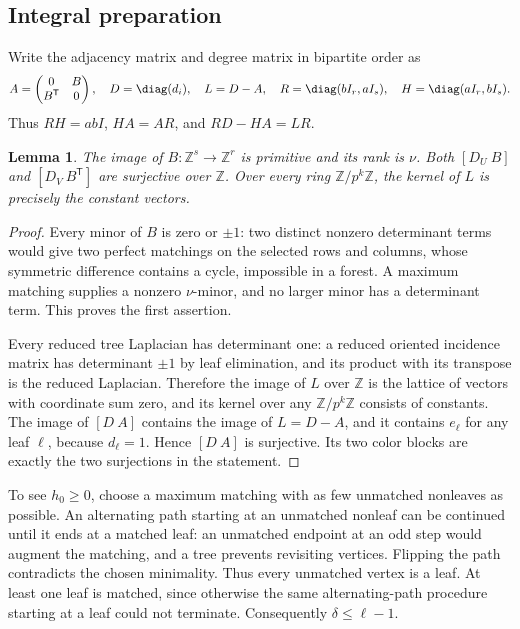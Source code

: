 \documentclass[11pt,a4paper]{article}
\newtheorem{lemma}[theorem]{Lemma}
\theoremstyle{definition}\newtheorem{definition}[theorem]{Definition}
\theoremstyle{remark}\newtheorem{remark}[theorem]{Remark}
\newcommand{\Z}{\mathbb Z}\newcommand{\Q}{\mathbb Q}\newcommand{\F}{\mathbb F}
\numberwithin{equation}{section}
\begin{document}
\subsection{Integral preparation}\label{K07-sec-2}
Write the adjacency matrix and degree matrix in bipartite order as
\[
 A=\begin{pmatrix}0&B\\B^{\mathsf T}&0\end{pmatrix},\quad
 D=\diag(d_i),\quad L=D-A,\quad
 R=\diag(bI_r,aI_s),\quad H=\diag(aI_r,bI_s).
\]
Thus $RH=abI$, $HA=AR$, and $RD-HA=LR$.
\begin{lemma}\label{K07-tree}
The image of $B:\Z^s\to\Z^r$ is primitive and its rank is $\nu$. Both $[D_U\ B]$ and $[D_V\ B^{\mathsf T}]$ are surjective over $\Z$. Over every ring $\Z/p^k\Z$, the kernel of $L$ is precisely the constant vectors.
\end{lemma}
\begin{proof}
Every minor of $B$ is zero or $\pm1$: two distinct nonzero determinant terms would give two perfect matchings on the selected rows and columns, whose symmetric difference contains a cycle, impossible in a forest. A maximum matching supplies a nonzero $\nu$-minor, and no larger minor has a determinant term. This proves the first assertion.

Every reduced tree Laplacian has determinant one: a reduced oriented incidence matrix has determinant $\pm1$ by leaf elimination, and its product with its transpose is the reduced Laplacian. Therefore the image of $L$ over $\Z$ is the lattice of vectors with coordinate sum zero, and its kernel over any $\Z/p^k\Z$ consists of constants. The image of $[D\ A]$ contains the image of $L=D-A$, and it contains $e_\ell$ for any leaf $\ell$, because $d_\ell=1$. Hence $[D\ A]$ is surjective. Its two color blocks are exactly the two surjections in the statement.
\end{proof}
To see $h_0\geq0$, choose a maximum matching with as few unmatched nonleaves as possible. An alternating path starting at an unmatched nonleaf can be continued until it ends at a matched leaf: an unmatched endpoint at an odd step would augment the matching, and a tree prevents revisiting vertices. Flipping the path contradicts the chosen minimality. Thus every unmatched vertex is a leaf. At least one leaf is matched, since otherwise the same alternating-path procedure starting at a leaf could not terminate. Consequently $\delta\leq\ell-1$.
\end{document}

